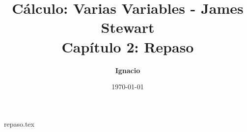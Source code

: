\documentclass[11pt,spanish,oneside]{report}
\title{\textbf{Cálculo: Varias Variables - James Stewart} \\ \Large Capítulo 2: Repaso}
\author{\textbf{Ignacio}}
\date{\today}
\begin{document}
\maketitle

{repaso.tex}
\end{document}
